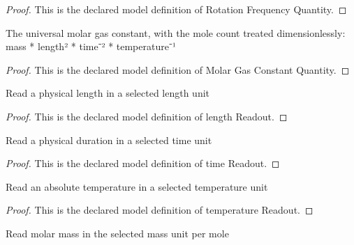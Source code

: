 \begin{proof}
  This is the declared model definition of Rotation Frequency Quantity.
\end{proof}
\begin{definition}
  \label{def:physics:phyx-mini-0564:phyxminiproblems-problemphyxmini0564-molargasconstantquantity}
  The universal molar gas constant, with the mole count treated dimensionlessly: mass * length² * time⁻² * temperature⁻¹
\end{definition}
\begin{proof}
  This is the declared model definition of Molar Gas Constant Quantity.
\end{proof}
\begin{definition}
  \label{def:physics:phyx-mini-0564:phyxminiproblems-problemphyxmini0564-lengthreadout}
  Read a physical length in a selected length unit
\end{definition}
\begin{proof}
  This is the declared model definition of length Readout.
\end{proof}
\begin{definition}
  \label{def:physics:phyx-mini-0564:phyxminiproblems-problemphyxmini0564-timereadout}
  Read a physical duration in a selected time unit
\end{definition}
\begin{proof}
  This is the declared model definition of time Readout.
\end{proof}
\begin{definition}
  \label{def:physics:phyx-mini-0564:phyxminiproblems-problemphyxmini0564-temperaturereadout}
  Read an absolute temperature in a selected temperature unit
\end{definition}
\begin{proof}
  This is the declared model definition of temperature Readout.
\end{proof}
\begin{definition}
  \label{def:physics:phyx-mini-0564:phyxminiproblems-problemphyxmini0564-molarmassreadout}
  Read molar mass in the selected mass unit per mole
\end{definition}
